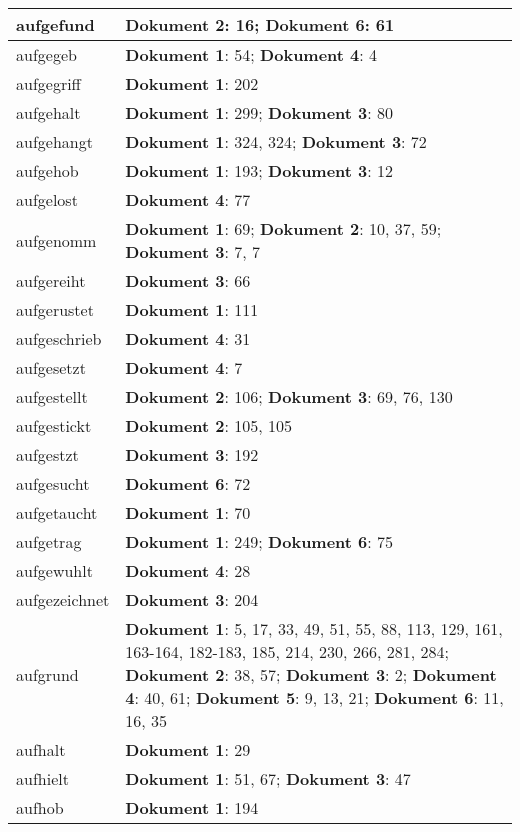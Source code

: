 \documentclass[a5paper]{article}
\begin{document}
\begin{longtable}[l]{|l|p{3in}|}
\hline
aufgefund & \textbf{Dokument 2}: 16; \textbf{Dokument 6}: 61 \\
\hline
aufgegeb & \textbf{Dokument 1}: 54; \textbf{Dokument 4}: 4 \\
\hline
aufgegriff & \textbf{Dokument 1}: 202 \\
\hline
aufgehalt & \textbf{Dokument 1}: 299; \textbf{Dokument 3}: 80 \\
\hline
aufgehangt & \textbf{Dokument 1}: 324, 324; \textbf{Dokument 3}: 72 \\
\hline
aufgehob & \textbf{Dokument 1}: 193; \textbf{Dokument 3}: 12 \\
\hline
aufgelost & \textbf{Dokument 4}: 77 \\
\hline
aufgenomm & \textbf{Dokument 1}: 69; \textbf{Dokument 2}: 10, 37, 59; \textbf{Dokument 3}: 7, 7 \\
\hline
aufgereiht & \textbf{Dokument 3}: 66 \\
\hline
aufgerustet & \textbf{Dokument 1}: 111 \\
\hline
aufgeschrieb & \textbf{Dokument 4}: 31 \\
\hline
aufgesetzt & \textbf{Dokument 4}: 7 \\
\hline
aufgestellt & \textbf{Dokument 2}: 106; \textbf{Dokument 3}: 69, 76, 130 \\
\hline
aufgestickt & \textbf{Dokument 2}: 105, 105 \\
\hline
aufgestzt & \textbf{Dokument 3}: 192 \\
\hline
aufgesucht & \textbf{Dokument 6}: 72 \\
\hline
aufgetaucht & \textbf{Dokument 1}: 70 \\
\hline
aufgetrag & \textbf{Dokument 1}: 249; \textbf{Dokument 6}: 75 \\
\hline
aufgewuhlt & \textbf{Dokument 4}: 28 \\
\hline
aufgezeichnet & \textbf{Dokument 3}: 204 \\
\hline
aufgrund & \textbf{Dokument 1}: 5, 17, 33, 49, 51, 55, 88, 113, 129, 161, 163-164, 182-183, 185, 214, 230, 266, 281, 284; \textbf{Dokument 2}: 38, 57; \textbf{Dokument 3}: 2; \textbf{Dokument 4}: 40, 61; \textbf{Dokument 5}: 9, 13, 21; \textbf{Dokument 6}: 11, 16, 35 \\
\hline
aufhalt & \textbf{Dokument 1}: 29 \\
\hline
aufhielt & \textbf{Dokument 1}: 51, 67; \textbf{Dokument 3}: 47 \\
\hline
aufhob & \textbf{Dokument 1}: 194 \\

\end{longtable}
\end{document}
